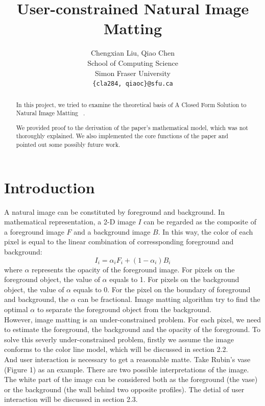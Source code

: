\documentclass[11pt,letterpaper]{article}
\title{User-constrained Natural Image Matting}
\author{Chengxian Liu, Qiao Chen\\
  School of Computing Science \\ Simon Fraser University \\
  {\tt \{cla284, qiaoc\}@sfu.ca}  
}
\begin{document}
\maketitle
\begin{abstract}
In this project, we tried to examine the theoretical basis of A Closed Form Solution to Natural Image Matting ~\cite{Levin:2006}.

We provided proof to the derivation of the paper’s mathematical model, which was not thoroughly explained. We also implemented the core functions of the paper and pointed out some possibly future work.
\end{abstract}

\section{Introduction}
A natural image can be constituted by foreground and background. In mathematical representation, a 2-D image $I$ can be regarded as the composite of a foreground image $F$ and a background image $B$. In this way, the color of each pixel is equal to the linear combination of corressponding foreground and background:\\
\begin{equation}
  I_{i} = \alpha_{i}F_{i} + (1-\alpha_{i})B_{i}
\end{equation}
where $\alpha$ represents the opacity of the foreground image. For pixels on the foreground object, the value of $\alpha$ equals to 1. For pixels on the background object, the value of $\alpha$ equals to 0. For the pixel on the boundary of foreground and background, the $\alpha$ can be fractional. Image matting algorithm try to find the optimal $\alpha$ to separate the foreground object from the background. \\

However, image matting is an under-constrained problem. For each pixel, we need to estimate the foreground, the background and the opacity of the foreground. To solve this severly under-constrained problem, firstly we assume the image conforms to the color line model, which will be discussed in section 2.2. \\

And user interaction is necessary to get a reasonable matte. Take Rubin’s vase (Figure 1) as an example. There are two possible interpretations of the image. The white part of the image can be considered both as the foreground (the vase) or the background (the wall behind two opposite profiles). The detial of user interaction will be discussed in section 2.3. \\
\end{document}
